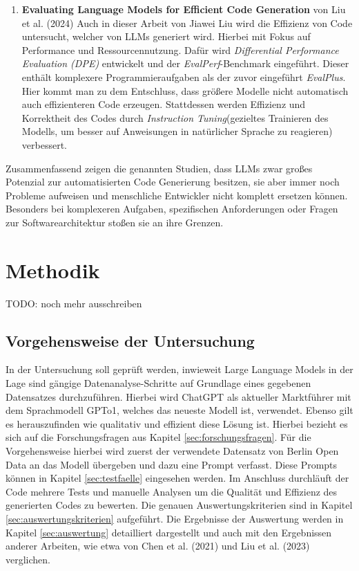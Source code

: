 \documentclass[11pt,a4paper]{article}
\begin{document}
\begin{enumerate}
    \item \textbf{Evaluating Language Models for Efficient Code Generation} von Liu et al. (2024) \cite{liu2024evaluating}
    Auch in dieser Arbeit von Jiawei Liu wird die Effizienz von Code untersucht, welcher von LLMs generiert wird. Hierbei mit Fokus auf Performance und Ressourcennutzung. Dafür wird \emph{Differential Performance Evaluation (DPE)} entwickelt und der \emph{EvalPerf}-Benchmark eingeführt. Dieser enthält komplexere Programmieraufgaben als der zuvor eingeführt \emph{EvalPlus}. Hier kommt man zu dem Entschluss, dass größere Modelle nicht automatisch auch effizienteren Code erzeugen. Stattdessen werden Effizienz und Korrektheit des Codes durch \emph{Instruction Tuning}(gezieltes Trainieren des Modells, um besser auf Anweisungen in natürlicher Sprache zu reagieren) verbessert.
\end{enumerate}
Zusammenfassend zeigen die genannten Studien, dass LLMs zwar großes Potenzial zur automatisierten Code Generierung besitzen, sie aber immer noch Probleme aufweisen und menschliche Entwickler nicht komplett ersetzen können. Besonders bei komplexeren Aufgaben, spezifischen Anforderungen oder Fragen zur Softwarearchitektur stoßen sie an ihre Grenzen.

\section{Methodik}
\label{sec:methodik}
TODO: noch mehr ausschreiben

\subsection{Vorgehensweise der Untersuchung}
    In der Untersuchung soll geprüft werden, inwieweit Large Language Models in der Lage sind gängige Datenanalyse-Schritte auf Grundlage eines gegebenen Datensatzes durchzuführen. Hierbei wird ChatGPT als aktueller Marktführer mit dem Sprachmodell GPTo1, welches das neueste Modell ist, verwendet. Ebenso gilt es herauszufinden wie qualitativ und effizient diese Lösung ist. Hierbei bezieht es sich auf die Forschungsfragen aus Kapitel \ref{sec:forschungsfragen}.
    Für die Vorgehensweise hierbei wird zuerst der verwendete Datensatz von Berlin Open Data an das Modell übergeben und dazu eine Prompt verfasst. Diese Prompts können in Kapitel \ref{sec:testfaelle} eingesehen werden.
    Im Anschluss durchläuft der Code mehrere Tests und manuelle Analysen um die Qualität und Effizienz des generierten Codes zu bewerten. Die genauen Auswertungskriterien sind in Kapitel \ref{sec:auswertungskriterien} aufgeführt.
    Die Ergebnisse der Auswertung werden in Kapitel \ref{sec:auswertung} detailliert dargestellt und auch mit den Ergebnissen anderer Arbeiten, wie etwa von Chen et al. (2021)\cite{chen2021evaluatinglargelanguagemodels} und Liu et al. (2023)\cite{NEURIPS2023_43e9d647} verglichen.
\end{document}
